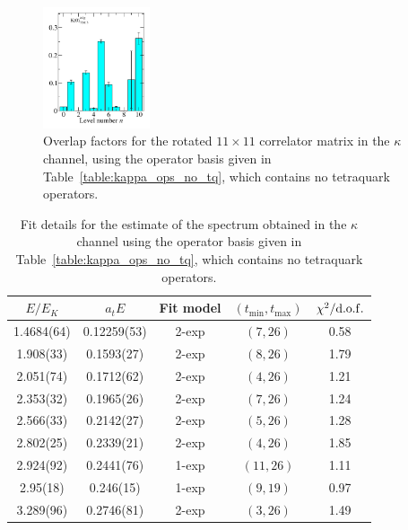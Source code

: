 \begin{figure}
  \includegraphics[width=0.28\textwidth]{figures/spectrum_a1g/no_tq/zfactors/zfactor_kaon-P000-A1g_1-TDU_5.pdf}
  \caption{Overlap factors for the rotated $11\times 11$ correlator matrix in the $\kappa$ channel, using the operator basis given in Table~\ref{table:kappa_ops_no_tq}, which contains no tetraquark operators.}
  \label{fig:kappa_no_tq_zfactors}
\end{figure}

\begin{table}
  \centering
  \begin{tabular}{c|c|c|c|c}
    $E / E_K$ & $a_t E$ & Fit model & $(t_{\mathrm{min}}, {t_\mathrm{max}})$ & $\chi^2 / \rm{d.o.f.}$\\
    \hline
    1.4684(64)&0.12259(53)&2{-}exp&$(7, 26)$&0.58\\
1.908(33)&0.1593(27)&2{-}exp&$(8, 26)$&1.79\\%
2.051(74)&0.1712(62)&2{-}exp&$(4, 26)$&1.21\\
2.353(32)&0.1965(26)&2{-}exp&$(7, 26)$&1.24\\
2.566(33)&0.2142(27)&2{-}exp&$(5, 26)$&1.28\\
2.802(25)&0.2339(21)&2{-}exp&$(4, 26)$&1.85\\
2.924(92)&0.2441(76)&1{-}exp&$(11, 26)$&1.11\\
2.95(18)&0.246(15)&1{-}exp&$(9, 19)$&0.97\\
3.289(96)&0.2746(81)&2{-}exp&$(3, 26)$&1.49
  \end{tabular}
  \caption{Fit details for the estimate of the spectrum obtained in the $\kappa$ channel using the operator basis given in Table~\ref{table:kappa_ops_no_tq}, which contains no tetraquark operators.}
  \label{table:kappa_no_tq_spectrum}
\end{table}

